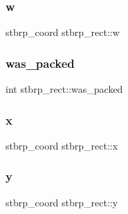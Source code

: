 \hypertarget{structstbrp__rect_a248d43f1eb979c1e7b92ba6df431dec5}{}\label{structstbrp__rect_a248d43f1eb979c1e7b92ba6df431dec5} 
\subsubsection{\texorpdfstring{w}{w}}
{\footnotesize\ttfamily stbrp\+\_\+coord stbrp\+\_\+rect\+::w}

\hypertarget{structstbrp__rect_a74ba347755ce17f2f8a2ea66c612af49}{}\label{structstbrp__rect_a74ba347755ce17f2f8a2ea66c612af49} 
\subsubsection{\texorpdfstring{was\+\_\+packed}{was\_packed}}
{\footnotesize\ttfamily int stbrp\+\_\+rect\+::was\+\_\+packed}

\hypertarget{structstbrp__rect_a4cc623a3e29f0bc0d3375f6645c84d18}{}\label{structstbrp__rect_a4cc623a3e29f0bc0d3375f6645c84d18} 
\subsubsection{\texorpdfstring{x}{x}}
{\footnotesize\ttfamily stbrp\+\_\+coord stbrp\+\_\+rect\+::x}

\hypertarget{structstbrp__rect_ae3034c1fbf86043b568f5a4dddf946fa}{}\label{structstbrp__rect_ae3034c1fbf86043b568f5a4dddf946fa} 
\subsubsection{\texorpdfstring{y}{y}}
{\footnotesize\ttfamily stbrp\+\_\+coord stbrp\+\_\+rect\+::y}

